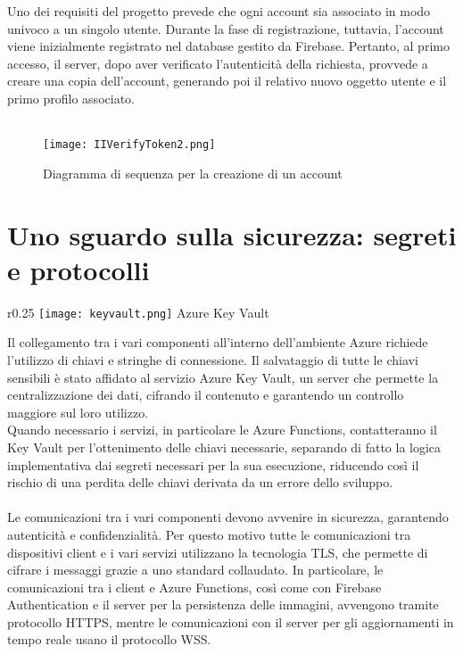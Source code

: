 Uno dei requisiti del progetto prevede
che ogni account sia associato in modo univoco a un singolo utente.
Durante la fase di registrazione, tuttavia,
l’account viene inizialmente registrato nel database gestito da Firebase.
Pertanto, al primo accesso, il server, dopo aver verificato l’autenticità della richiesta,
provvede a creare una copia dell’account,
generando poi il relativo nuovo oggetto utente e il primo profilo associato.\\
\\
\begin{figure}[htpb]
    \centering
    \texttt{[image: IIVerifyToken2.png]}
    \caption{Diagramma di sequenza per la creazione di un account}
\end{figure}

\clearpage
\section{Uno sguardo sulla sicurezza: segreti e protocolli}
\begin{wrapfigure}{r}{0.25\textwidth}
    \centering
    \texttt{[image: keyvault.png]}
    Azure Key Vault
\end{wrapfigure}
Il collegamento tra i vari componenti all’interno dell’ambiente Azure
richiede l’utilizzo di chiavi e stringhe di connessione.
Il salvataggio di tutte le chiavi sensibili è stato affidato al servizio Azure Key Vault,
un server che permette la centralizzazione dei dati,
cifrando il contenuto e garantendo un controllo maggiore sul loro utilizzo. \\
Quando necessario i servizi, in particolare le Azure Functions,
contatteranno il Key Vault per l'ottenimento delle chiavi necessarie,
separando di fatto la logica implementativa dai segreti necessari per la sua esecuzione,
riducendo così il rischio di una perdita delle chiavi derivata da un errore dello sviluppo.\\
\\
Le comunicazioni tra i vari componenti devono avvenire in sicurezza,
garantendo autenticità e confidenzialità.
Per questo motivo tutte le comunicazioni tra dispositivi client e
i vari servizi utilizzano la tecnologia TLS,
che permette di cifrare i messaggi grazie a uno standard collaudato.
In particolare, le comunicazioni tra i client e Azure Functions,
così come con Firebase Authentication e il server per la persistenza delle immagini,
avvengono tramite protocollo HTTPS,
mentre le comunicazioni con il server per gli aggiornamenti in tempo reale usano il protocollo WSS.\\
